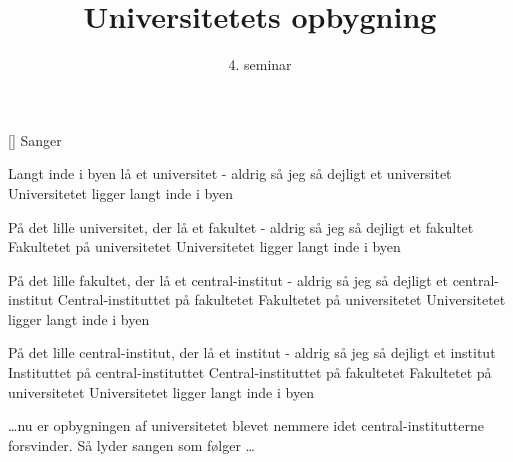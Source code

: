 \documentclass[a4paper,11pt]{article}
\title{Universitetets opbygning}
\author{4. seminar}
\begin{document}
\maketitle

\begin{roles}
[] Sanger
\end{roles}

\begin{song}
   Langt inde i byen lå et universitet
            - aldrig så jeg så dejligt et universitet
            Universitetet ligger langt inde i byen

   På det lille universitet, der lå et fakultet
            - aldrig så jeg så dejligt et fakultet
            Fakultetet på universitetet
            Universitetet ligger langt inde i byen

   På det lille fakultet, der lå et central-institut
            - aldrig så jeg så dejligt et central-institut
            Central-instituttet på fakultetet 
            Fakultetet på universitetet
            Universitetet ligger langt inde i byen

   På det lille central-institut, der lå et institut 
            - aldrig så jeg så dejligt et institut
            Instituttet på central-instituttet 
            Central-instituttet på fakultetet 
            Fakultetet på universitetet
            Universitetet ligger langt inde i byen
\end{song}

\begin{sketch}
     \ldots nu er opbygningen af universitetet blevet nemmere idet central-institutterne forsvinder.
             Så lyder sangen som følger \ldots
\end{sketch}
\end{document}
